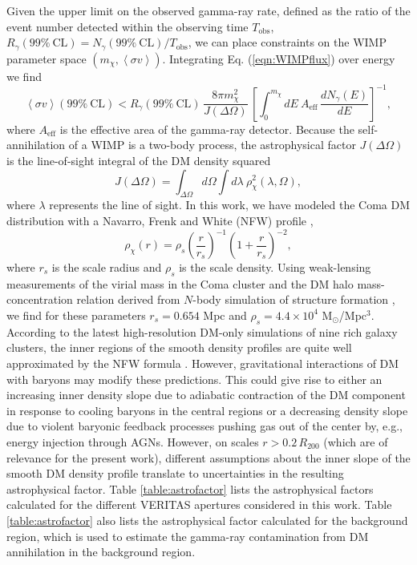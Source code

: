 \documentclass[12pt,manuscript]{aastex}
\newcommand{\expval}[1]{\left\langle #1 \right\rangle}
\begin{document}
Given the upper limit on the observed gamma-ray rate, defined as the ratio of the event number detected within the observing time $T_{\mathrm{obs}}$,
$R_{\gamma}(99\%\ \mathrm{CL}) = N_{\gamma}(99\%\ \mathrm{CL}) / T_{\mathrm{obs}}$, we can place
constraints on the WIMP parameter space $(m_{\chi}, \expval{\sigma v})$. Integrating Eq.
(\ref{eqn:WIMPflux}) over energy we find
\begin{equation}
\expval{\sigma v}(99\%\ \mathrm{CL}) <
R_{\gamma}(99\%\ \mathrm{CL})\, \frac{8\pi m_{\chi}^{2}}{J(\Delta\Omega)}\,
\left[\int^{m_{\chi}}_{0} dE\ A_{\mathrm{eff}}\,\frac{dN_\gamma (E)}{dE}\right]^{-1},
\end{equation}
where $A_{\mathrm{eff}}$ is the effective area of the gamma-ray detector.
Because the self-annihilation of a WIMP is a two-body process, the astrophysical factor
$J(\Delta\Omega)$ is the line-of-sight integral of the DM density squared
\begin{equation}
J(\Delta\Omega)=\int_{\Delta\Omega}d\Omega\int d\lambda\ \rho_{\chi}^{2}(\lambda,\Omega),
\end{equation}
where $\lambda$ represents the line of sight. In this work, we have modeled the Coma DM
distribution with a Navarro, Frenk and White (NFW) profile \citep{article:NavarroFrenkWhite:1997},
\begin{equation}
\rho_{\chi}(r)=\rho_{s}\left(\frac{r}{r_{s}}\right)^{-1}\left(1+\frac{r}{r_{s}}\right)^{-2},
\end{equation}
where $r_{s}$ is the scale radius and $\rho_{s}$ is the scale density. Using weak-lensing
measurements of the virial mass in the Coma cluster \citep{article:Gavazzi_etal:2009} and the DM
halo mass-concentration relation derived from $N$-body simulation of structure formation
\citep{article:Bullock_etal:2001}, we find for these parameters $r_{s}=0.654$ Mpc and
$\rho_{s}=4.4\times 10^{4}$ M$_{\odot}$/Mpc$^{3}$. According to the latest high-resolution DM-only
simulations of nine rich galaxy clusters, the inner regions of the smooth density profiles are quite
well approximated by the NFW formula \citep{article:Gao_etal:2012}. However, gravitational
interactions of DM with baryons may modify these predictions. This could give rise to either an
increasing inner density slope due to adiabatic contraction of the DM component in response to
cooling baryons in the central regions or a decreasing density slope due to violent baryonic
feedback processes pushing gas out of the center by, e.g., energy injection through AGNs. However,
on scales $r>0.2\,R_{200}$ (which are of relevance for the present work), different assumptions
about the inner slope of the smooth DM density profile translate to 
uncertainties in the
resulting astrophysical factor. Table \ref{table:astrofactor} lists the
astrophysical factors calculated for the different VERITAS apertures considered in this work.  Table
\ref{table:astrofactor} also lists the astrophysical factor calculated for the background region,
which is used to estimate the gamma-ray contamination from DM annihilation in the background region.
\end{document}
